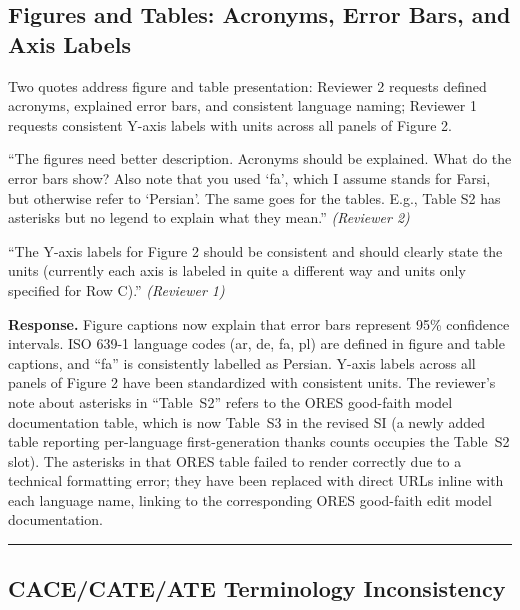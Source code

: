 \documentclass[12pt]{article}
\newenvironment{reviewquote}{%
  \def\FrameCommand{{\color{quotebarcolor}\vrule width 2pt}\colorbox{quotebg}}%
  \MakeFramed{\advance\hsize-\width \FrameRestore}%
  \small
}{%
  \endMakeFramed
}
\newcommand{\sectionnote}[1]{\par\smallskip#1\par\medskip}
\begin{document}
\subsection{Figures and Tables: Acronyms, Error Bars, and Axis Labels}

\sectionnote{Two quotes address figure and table presentation: Reviewer 2 requests defined acronyms, explained error bars, and consistent language naming; Reviewer 1 requests consistent Y-axis labels with units across all panels of Figure 2.}

\begin{reviewquote}
``The figures need better description. Acronyms should be explained. What do the error bars show? Also note that you used `fa', which I assume stands for Farsi, but otherwise refer to `Persian'. The same goes for the tables. E.g., Table S2 has asterisks but no legend to explain what they mean.'' \textit{(Reviewer 2)}
\end{reviewquote}

\begin{reviewquote}
``The Y-axis labels for Figure 2 should be consistent and should clearly state the units (currently each axis is labeled in quite a different way and units only specified for Row C).'' \textit{(Reviewer 1)}
\end{reviewquote}

\textbf{Response.} Figure captions now explain that error bars represent 95\% confidence intervals. ISO 639-1 language codes (ar, de, fa, pl) are defined in figure and table captions, and ``fa'' is consistently labelled as Persian. Y-axis labels across all panels of Figure 2 have been standardized with consistent units. The reviewer's note about asterisks in ``Table~S2'' refers to the ORES good-faith model documentation table, which is now Table~S3 in the revised SI (a newly added table reporting per-language first-generation thanks counts occupies the Table~S2 slot). The asterisks in that ORES table failed to render correctly due to a technical formatting error; they have been replaced with direct URLs inline with each language name, linking to the corresponding ORES good-faith edit model documentation.

\bigskip\hrule\bigskip

\subsection{CACE/CATE/ATE Terminology Inconsistency}
\end{document}
